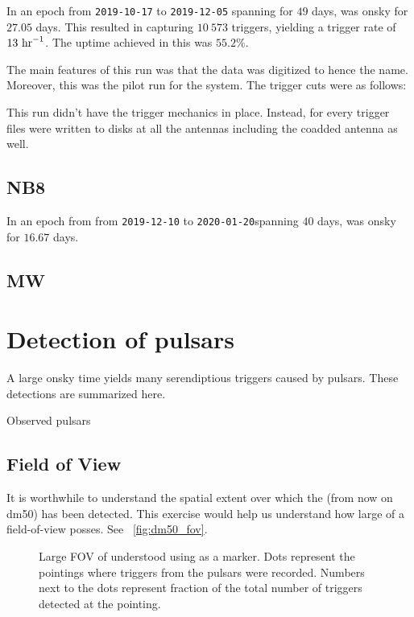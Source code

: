 \par In an epoch from \texttt{2019-10-17} to \texttt{2019-12-05} spanning for $49$ days, \vf was onsky for $27.05$ days. 
This resulted in capturing $10\ 573$ triggers, yielding a trigger rate of $13\ {\rm hr}^{-1}$. The uptime achieved in this was $55.2\%$.

\par The main features of this run was that the data was digitized to  hence the name. Moreover, this was the pilot run for the \vf system.
The trigger cuts were as follows:

\par This run didn't have the \dbson trigger mechanics in place. Instead, for every trigger \fbson~ files were written to disks at all the antennas including the coadded antenna as well.

\subsection {NB8}

\par In an epoch from from \texttt{2019-12-10} to \texttt{2020-01-20}spanning $40$ days, \vf was onsky for $16.67$ days.

\subsection {MW}


\section {Detection of pulsars}

\par A large onsky time yields many serendiptious triggers caused by pulsars. These detections are summarized here.

\begin{table}
\caption {Observed pulsars}
\end{table}

\subsection{Field of View}

\par It is worthwhile to understand the spatial extent over which the  (from now on dm50) has been detected. 
This exercise would help us understand how large of a field-of-view \vf posses.
See ~\autoref{fig:dm50_fov}. 
\begin{figure}
	\label{fig:dm50_fov}
	\caption{Large FOV of \vf understood using  as a marker. 
	Dots represent the pointings where triggers from the pulsars were recorded.
	Numbers next to the dots represent fraction of the total number of triggers detected at the pointing.
}
\end{figure}

